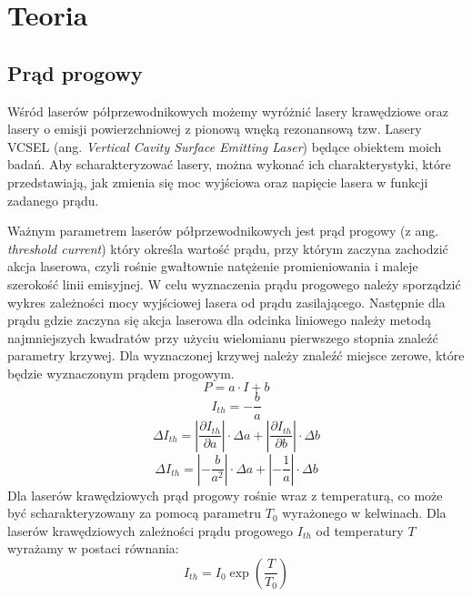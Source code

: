 \section{Teoria}
\subsection{Prąd progowy}
Wśród laserów półprzewodnikowych możemy wyróżnić lasery krawędziowe oraz lasery o emisji powierzchniowej z pionową wnęką rezonansową tzw. Lasery VCSEL (ang. \textit{Vertical Cavity Surface Emitting Laser}) będące obiektem moich badań. Aby scharakteryzować lasery, można wykonać ich charakterystyki, które przedstawiają, jak zmienia się moc wyjściowa oraz napięcie lasera w funkcji zadanego prądu.

Ważnym parametrem laserów półprzewodnikowych jest prąd progowy (z ang. \textit{threshold
current}) który określa wartość prądu, przy którym zaczyna zachodzić akcja laserowa, czyli
rośnie gwałtownie natężenie promieniowania i maleje szerokość linii emisyjnej. W celu wyznaczenia prądu progowego należy sporządzić wykres zależności mocy wyjściowej lasera od prądu zasilającego. Następnie dla prądu gdzie zaczyna się akcja laserowa dla odcinka liniowego należy metodą najmniejszych kwadratów przy użyciu wielomianu pierwszego stopnia znaleźć parametry krzywej. Dla wyznaczonej krzywej należy znaleźć miejsce zerowe, które będzie wyznaczonym prądem progowym.
\begin{equation}
P = a \cdot I + b
\end{equation}
\begin{equation}
I_{th} = -\frac{b}{a}
\end{equation}
\begin{equation}
\Delta I_{th} = \left\lvert \frac{\partial I_{th}}{\partial a} \right\rvert \cdot \Delta a + \left\lvert \frac{\partial I_{th}}{\partial b} \right\rvert \cdot \Delta b
\end{equation}
\begin{equation}
\Delta I_{th} = \left\lvert -\frac{b}{a^2} \right\rvert \cdot \Delta a + \left\lvert -\frac{1}{a} \right\rvert \cdot \Delta b
\end{equation}
Dla laserów krawędziowych prąd progowy rośnie wraz z temperaturą, co może być scharakteryzowany za pomocą parametru
$T_{0}$ wyrażonego w kelwinach.
Dla laserów krawędziowych zależności prądu progowego $I_{th}$ od temperatury $T$ wyrażamy w postaci równania:
\begin{equation}
I_{th} = I_0 \exp \left( \frac{T}{T_0} \right)
\end{equation}

